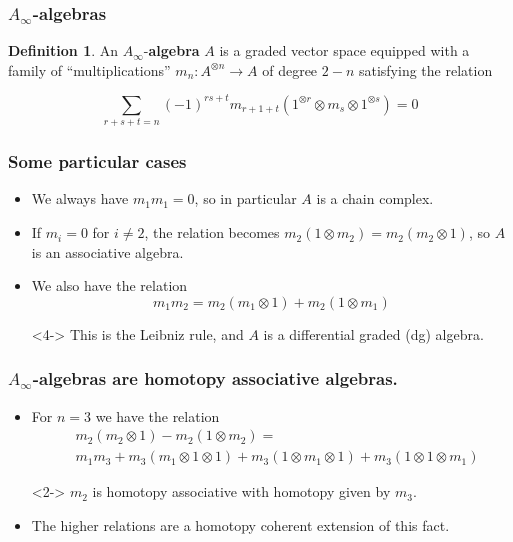 \documentclass{beamer}
\theoremstyle{definition}
\newtheorem{defi}{Definition}
\begin{document}
\begin{frame}
\frametitle{$A_\infty$-algebras}
\begin{defi}
An $A_\infty$-\textbf{algebra} $A$ is a graded vector space equipped with a family of ``multiplications'' $m_n:A^{\otimes n}\to A$ of degree $2-n$ satisfying the relation %

\[\sum_{r+s+t=n}(-1)^{rs+t}m_{r+1+t}(1^{\otimes r}\otimes m_s\otimes 1^{\otimes s})=0\] %
\end{defi}
\end{frame}





\begin{frame}
\frametitle{Some particular cases}
\begin{itemize}
\item<1-> We always have $m_1m_1=0$, so in particular $A$ is a chain complex.%
\item<2-> If $m_i=0$ for $i\neq 2$, the relation becomes $m_2(1\otimes m_2)=m_2(m_2\otimes 1)$, so $A$ is an associative algebra.
\item<3-> We also have the relation \[m_1m_2=m_2(m_1\otimes 1)+m_2(1\otimes m_1)\]%
\item[]<4-> This is the Leibniz rule, and $A$ is a differential graded (dg) algebra.

\end{itemize}
\end{frame}


\begin{frame}
\frametitle{$A_\infty$-algebras are homotopy associative algebras.}
\begin{itemize}
\item<1-> For $n=3$ we have the relation
\begin{align*}
&m_2(m_2\otimes 1)-m_2(1\otimes m_2)=\\ %
&m_1m_3+m_3(m_1\otimes 1\otimes 1)+m_3(1\otimes m_1\otimes 1)+m_3(1\otimes 1\otimes m_1)
\end{align*}
\item[]<2-> $m_2$ is homotopy associative with homotopy given by $m_3$.  %
\item<3-> The higher relations are a homotopy coherent extension of this fact. %
\end{itemize}
\end{frame}
\end{document}
